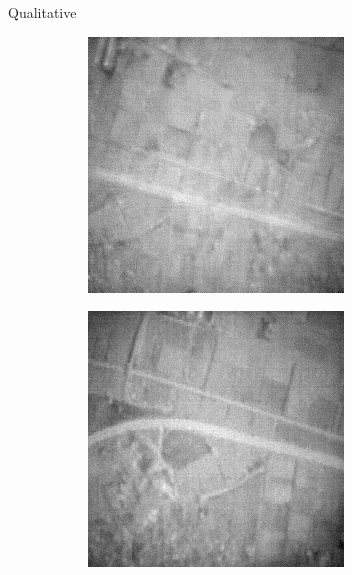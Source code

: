 \begin{frame}{Qualitative}
\begin{figure}
\begin{subfigure}[b]{0.24\textwidth}
        \end{subfigure}
        \hfill
        \begin{subfigure}[b]{0.24\textwidth}
            \centering
            \includegraphics[width=\textwidth]{../figs/outputs/petit/71.png}
        \end{subfigure}
        \hfill
        \begin{subfigure}[b]{0.24\textwidth}
            \centering
            \includegraphics[width=\textwidth]{../figs/outputs/mono/605.png}
        \end{subfigure}      
                

\end{figure}
\end{frame}
